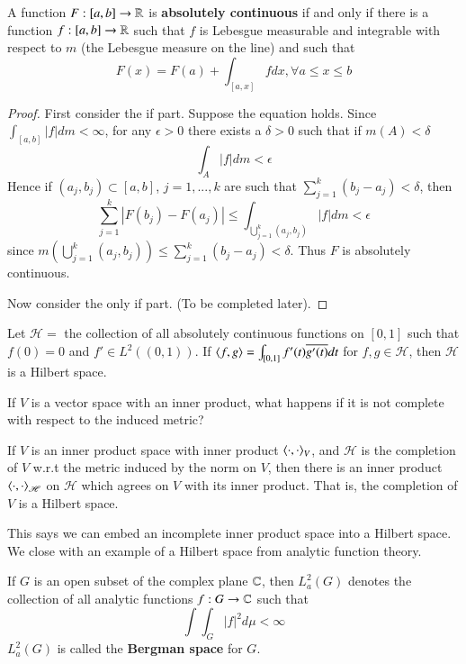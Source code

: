 \begin{thm}
    A function $F:[a,b]\rightarrow \mathbb R$ is \textbf{absolutely continuous} if and only if there is a function $f:[a,b]\rightarrow \mathbb R$ such that $f$ is Lebesgue measurable and integrable with respect to $m$ (the Lebesgue measure on the line) and such that $$F(x) = F(a) + \int_{[a,x]}fdx,\forall a \leq x \leq b$$
\end{thm}
\begin{proof}
    First consider the if part. Suppose the equation holds. Since $\int_{[a,b]}|f| dm < \infty$, for any $\epsilon > 0$ there exists a $\delta > 0$ such that if $m(A) < \delta$ $$\int_A|f|dm < \epsilon$$
    Hence if $(a_j,b_j) \subset [a,b]$, $j = 1,...,k$ are such that $\sum_{j=1}^k(b_j-a_j) < \delta$, then $$\sum_{j=1}^k|F(b_j)-F(a_j)| \leq \int_{\bigcup_{j=1}^k(a_j,b_j)}|f|dm < \epsilon$$
    since $m(\bigcup_{j=1}^k(a_j,b_j)) \leq \sum_{j=1}^k(b_j-a_j) < \delta$. Thus $F$ is absolutely continuous.

    Now consider the only if part. (To be completed later).
\end{proof}

\begin{eg}
    Let $\mathscr{H} = $ the collection of all absolutely continuous functions on $[0,1]$ such that $f(0) = 0$ and $f' \in L^2((0,1))$. If $\left\langle f, g\right\rangle = \int_{[0,1]}f'(t)\overline{g'(t)}dt$ for $f,g \in \mathscr{H}$, then $\mathscr{H}$ is a Hilbert space.
\end{eg}

If $V$ is a vector space with an inner product, what happens if it is not complete with respect to the induced metric?

\begin{prop}
    If $V$ is an inner product space with inner product $\left\langle \cdot, \cdot\right\rangle_V$, and $\mathscr{H}$ is the completion of $V$ w.r.t the metric induced by the norm on $V$, then there is an inner product $\left\langle \cdot, \cdot\right\rangle_{\mathscr{H}}$ on $\mathscr{H}$ which agrees on $V$ with its inner product. That is, the completion of $V$ is a Hilbert space.
\end{prop}

This says we can embed an incomplete inner product space into a Hilbert space. We close with an example of a Hilbert space from analytic function theory.

\begin{defn}
    If $G$ is an open subset of the complex plane $\mathbb C$, then $L^2_a(G)$ denotes the collection of all analytic functions $f:G\rightarrow \mathbb C$ such that $$\int\int_G|f|^2d\mu < \infty$$
    $L_a^2(G)$ is called the \textbf{Bergman space} for $G$.
\end{defn}

